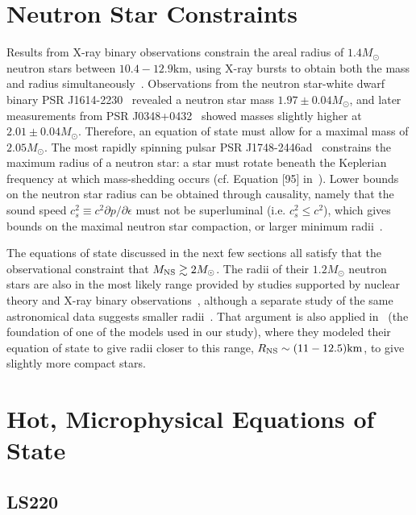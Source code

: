 \section{Neutron Star Constraints}
\label{sec:constraints}

Results from X-ray binary observations constrain the areal radius of $1.4M_\odot$ neutron stars between $10.4 - 12.9 \textrm{km}$, using X-ray bursts to obtain both the mass and radius simultaneously~\cite{van1979possible,ozel2006soft}.
Observations from the neutron star-white dwarf binary PSR J1614-2230~\cite{ozel2010massive} revealed a neutron star mass $1.97 \pm 0.04 M_\odot$, and later measurements from PSR J0348+0432~\cite{antoniadis2013massive} showed masses slightly higher at  $2.01 \pm 0.04 M_\odot$.  Therefore, an equation of state must allow for a maximal mass of $2.05 M_{\odot}$.
The most rapidly spinning pulsar PSR J1748-2446ad~\cite{hessels2006radio} constrains the maximum radius of a neutron star: a star must rotate beneath the Keplerian frequency at which mass-shedding occurs (cf. Equation [95] in~\cite{lattimer2016equation}).
Lower bounds on the neutron star radius can be obtained through causality, namely that the sound speed $c_s^2 \equiv c^2 \partial p / \partial \epsilon$ must not be superluminal (i.e. $c_s^2 \le c^2$), which gives bounds on the maximal neutron star compaction, or larger minimum radii~\cite{Haensel:1999}.

The equations of state discussed in the next few sections all satisfy that the observational constraint that $M_{\rm NS} \gtrsim 2 M_\odot$.
The radii of their $1.2 M_\odot$ neutron stars are also in the most likely range provided by studies supported by nuclear theory and X-ray binary observations~\cite{Steiner2010,2013ApJ...765L...5S}, although a separate study of the same astronomical data suggests smaller radii~\cite{Guillot:2013wu}.  
That argument is also  applied in~\cite{steiner2013core} (the foundation of one of the models used in our study), where they modeled their equation of state to give radii closer to this range, $R_{\rm NS} \sim (11-12.5) {\rm km}$, to give slightly more compact stars.

\section{Hot, Microphysical Equations of State}
\label{sec:nuclear-eos}

\subsection{LS220}
\label{sec:ls220}

